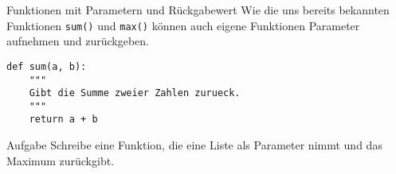 \begin{frame}[fragile]{Funktionen mit Parametern und Rückgabewert}
Wie die uns bereits bekannten Funktionen \lstinline{sum()} und \lstinline{max()}
können auch eigene Funktionen Parameter aufnehmen und zurückgeben.

\begin{lstlisting}
def sum(a, b):
    """
    Gibt die Summe zweier Zahlen zurueck.
    """
    return a + b
\end{lstlisting}

\begin{block}{Aufgabe}
Schreibe eine Funktion, die eine Liste als Parameter nimmt und das Maximum 
zurückgibt.
\end{block}
\end{frame}

